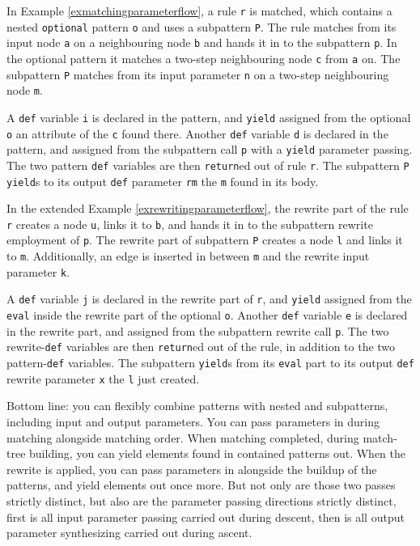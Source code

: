 In Example \ref{exmatchingparameterflow}, a rule \texttt{r} is matched, which contains a nested \texttt{optional} pattern \texttt{o} and uses a subpattern \texttt{P}.
The rule matches from its input node \texttt{a} on a neighbouring node \texttt{b} and hands it in to the subpattern \texttt{p}.
In the optional pattern it matches a two-step neighbouring node \texttt{c} from \texttt{a} on.
The subpattern \texttt{P} matches from its input parameter \texttt{n} on a two-step neighbouring node \texttt{m}.

A \texttt{def} variable \texttt{i} is declared in the pattern, and \texttt{yield} assigned from the optional \texttt{o} an attribute of the \texttt{c} found there.
Another \texttt{def} variable \texttt{d} is declared in the pattern, and assigned from the subpattern call \texttt{p} with a \texttt{yield} parameter passing. 
The two pattern \texttt{def} variables are then \texttt{return}ed out of rule \texttt{r}.
The subpattern \texttt{P} \texttt{yield}s to its output \texttt{def} parameter \texttt{rm} the \texttt{m} found in its body.

In the extended Example \ref{exrewritingparameterflow}, the rewrite part of the rule \texttt{r} creates a node \texttt{u}, links it to \texttt{b}, and hands it in to the subpattern rewrite employment of \texttt{p}.
The rewrite part of subpattern \texttt{P} creates a node \texttt{l} and links it to \texttt{m}.
Additionally, an edge is inserted in between \texttt{m} and the rewrite input parameter \texttt{k}.

A \texttt{def} variable \texttt{j} is declared in the rewrite part of \texttt{r}, and \texttt{yield} assigned from the \texttt{eval} inside the rewrite part of the optional \texttt{o}.
Another \texttt{def} variable \texttt{e} is declared in the rewrite part, and assigned from the subpattern rewrite call \texttt{p}.
The two rewrite-\texttt{def} variables are then \texttt{return}ed out of the rule, in addition to the two pattern-\texttt{def} variables.
The subpattern \texttt{yield}s from its \texttt{eval} part to its output \texttt{def} rewrite parameter \texttt{x} the \texttt{l} just created.

Bottom line: you can flexibly combine patterns with nested and subpatterns, including input and output parameters.
You can pass parameters in during matching alongside matching order. When matching completed, during match-tree building, you can yield elements found in contained patterns out. 
When the rewrite is applied, you can pass parameters in alongside the buildup of the patterns, and yield elements out once more.
But not only are those two passes strictly distinct, but also are the parameter passing directions strictly distinct, first is all input parameter passing carried out during descent, then is all output parameter synthesizing carried out during ascent.


